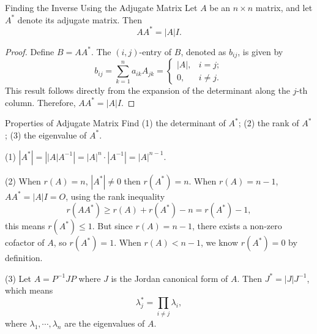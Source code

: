 \begin{proposition}{Finding the Inverse Using the Adjugate Matrix}{}
  Let $A$ be an $n \times n$ matrix, and let $A^{\ast}$ denote its adjugate matrix.
  Then
  \begin{equation}
    AA^{\ast} = |A| I.
  \end{equation}
\end{proposition}

\begin{proof}
  Define $B = AA^{\ast}$.
  The $(i,j)$-entry of $B$, denoted as $b_{ij}$, is given by 
  \begin{equation}
    b_{ij} = \sum\limits_{k = 1}^n a_{ik} A_{jk} =
    \begin{cases}
      |A|, & i = j;\\
      0, & i \neq j.
    \end{cases}
  \end{equation}
  This result follows directly from the expansion of the determinant along the
  $j$-th column.
  Therefore, $AA^{\ast} = |A|I$.
\end{proof}

\begin{example}{Properties of Adjugate Matrix}{}
  Find
  (1) the determinant of $A^{\ast}$;
  (2) the rank of $A^{\ast}$;
  (3) the eigenvalue of $A^{\ast}$.
\end{example}

\begin{solution}
  (1) $|A^{\ast}| = \left| |A| A^{-1} \right| = |A|^n \cdot |A^{-1}| = |A|^{n-1}$.

  (2) When $r(A) = n$, $|A^{\ast}| \neq 0$ then $r(A^{\ast}) = n$.
  When $r(A) = n-1$, $AA^{\ast} = |A|I = O$, using the rank inequality
  \begin{equation}
    r(AA^{\ast}) \geq r(A) + r(A^{\ast}) - n = r(A^{\ast}) - 1,
  \end{equation}
  this means $r(A^{\ast}) \leq 1$.
  But since $r(A) = n-1$, there exists a non-zero cofactor of $A$,
  so $r(A^{\ast}) = 1$.
  When $r(A) < n-1$, we know $r(A^{\ast}) = 0$ by definition.

  (3) Let $A = P^{-1}JP$ where $J$ is the Jordan canonical form of $A$.
  Then $J^{\ast} = |J|J^{-1}$, which means
  \begin{equation}
    \lambda_j^{\ast} = \prod \limits_{i \neq j} \lambda_i,
  \end{equation}
  where $\lambda_1,\cdots,\lambda_n$ are the eigenvalues of $A$.
\end{solution}

